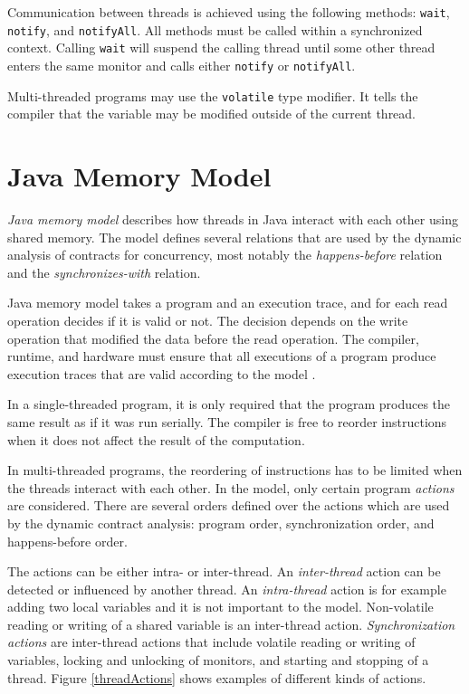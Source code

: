 Communication between threads is achieved using the following methods:
\texttt{wait}, \texttt{notify}, and \texttt{notifyAll}. All methods must be
called within a synchronized context. Calling \texttt{wait} will suspend the
calling thread until some other thread enters the same monitor and calls either
\texttt{notify} or \texttt{notifyAll}.

Multi-threaded programs may use the \texttt{volatile} type modifier. It tells
the compiler that the variable may be modified outside of the current thread.

\section{Java Memory Model}


\emph{Java memory model} describes how threads in Java interact with each other
using shared memory. The model defines several relations that are used by the
dynamic analysis of contracts for concurrency, most notably the
\emph{happens-before} relation and the \emph{synchronizes-with} relation.

Java memory model takes a program and an execution trace, and for each read
operation decides if it is valid or not. The decision depends on the write
operation that modified the data before the read operation. The compiler,
runtime, and hardware must ensure that all executions of a program produce
execution traces that are valid according to the model \cite{jmmspec}.

In a single-threaded program, it is only required that the program produces the
same result as if it was run serially. The compiler is free to reorder
instructions when it does not affect the result of the computation.

In multi-threaded programs, the reordering of instructions has to be limited
when the threads interact with each other. In the model, only certain program
\emph{actions} are considered. There are several orders defined over the actions
which are used by the dynamic contract analysis: program order, synchronization
order, and happens-before order.

The actions can be either intra- or inter-thread. An \emph{inter-thread} action
can be detected or influenced by another thread. An \emph{intra-thread} action
is for example adding two local variables and it is not important to the model.
Non-volatile reading or writing of a shared variable is an inter-thread action.
\emph{Synchronization actions} are inter-thread actions that include volatile
reading or writing of variables, locking and unlocking of monitors, and starting
and stopping of a thread. Figure \ref{threadActions} shows examples of different
kinds of actions.

